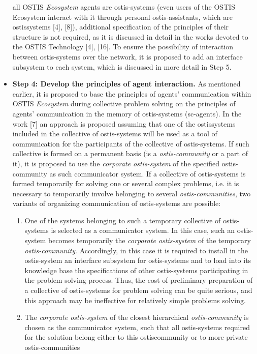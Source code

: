 \documentclass[12pt, a4paper]{article}
\begin{document}
\begin{multicols}{2}
\begin{itemize}
all OSTIS \textit{Ecosystem} agents are ostis-systems (even
users of the OSTIS Ecosystem interact with it
through personal ostis-assistants, which are ostissystems [4], [8]), additional specification of the
principles of their structure is not required, as it
is discussed in detail in the works devoted to the
OSTIS Technology [4], [16]. To ensure the possibility of interaction between ostis-systems over
the network, it is proposed to add an interface
subsystem to each system, which is discussed in
more detail in Step 5.
\item \textbf{Step 4: Develop the principles of agent interaction.} As mentioned earlier, it is proposed to base the
principles of agents’ communication within OSTIS
\textit{Ecosystem} during collective problem solving on the
principles of agents’ communication in the memory
of ostis-systems (sc-agents). In the work [7] an
approach is proposed assuming that one of the ostissystems included in the collective of ostis-systems
will be used as a tool of communication for the
participants of the collective of ostis-systems. If
such collective is formed on a permanent basis (is
a \textit{ostis-community} or a part of it), it is proposed
to use the \textit{corporate ostis-system} of the specified
ostis-community as such communicator system. If
a collective of ostis-systems is formed temporarily
for solving one or several complex problems, i.e.
it is necessary to temporarily involve 
belonging to several \textit{ostis-communities}, two variants
of organizing communication of ostis-systems are
possible:
\begin{enumerate}[label=\textbf{--},leftmargin=*]
\setlength{\itemsep}{0pt}
  \setlength{\parskip}{1pt}
  \setlength{\parsep}{0pt}
    \item One of the systems belonging to such a temporary collective of ostis-systems is selected as
a communicator system. In this case, such an
ostis-system becomes temporarily the \textit{corporate
ostis-system} of the temporary \textit{ostis-community}.
Accordingly, in this case it is required to install in
the ostis-system an interface subsystem for ostis-systems and to load into its knowledge base the
specifications of other ostis-systems participating
in the problem solving process. Thus, the cost of
preliminary preparation of a collective of ostis-systems for problem solving can be quite serious,
and this approach may be ineffective for relatively
simple problems solving.
\item The \textit{corporate ostis-system} of the closest hierarchical \textit{ostis-community} is chosen as the communicator system, such that all ostis-systems required for the solution belong either to this ostiscommunity or to more private ostis-communities

\end{enumerate}
\end{itemize}
\end{multicols}
\end{document}

